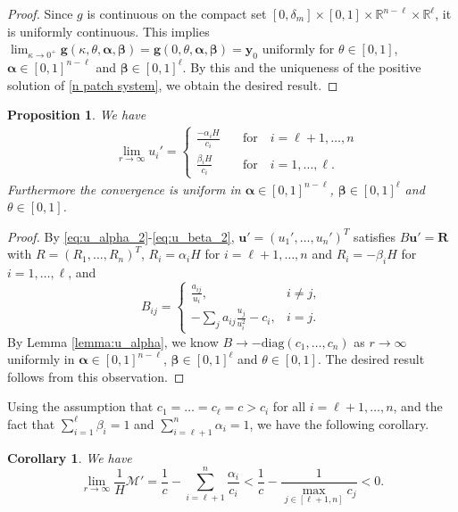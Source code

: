 \documentclass[11pt]{article}
\newtheorem{proposition}[theorem]{Proposition}
\newtheorem{corollary}[theorem]{Corollary}
\def\MM{\mathcal{M}}
\theoremstyle{definition}
\begin{document}
\begin{proof}
Since $g$ is continuous on the compact set $[0, \delta_m]\times [0, 1]\times \mathbb{R}^{n-\ell}\times\mathbb{R}^\ell$, it is uniformly continuous.
This implies $\lim_{\kappa\to 0^+} \bm g(\kappa, \theta, \bm\alpha,\bm\beta)=\bm g(0, \theta, \bm\alpha,\bm\beta)=\bm y_0$ uniformly for $\theta\in [0, 1]$, $\bm\alpha\in [0, 1]^{n-\ell}$ and $\bm\beta\in [0,1]^
\ell$. By this and the uniqueness of the positive solution of \eqref{n patch system}, we obtain the desired result.  
\end{proof}






\begin{proposition}\label{prop:u_alpha}
We have
\begin{align*}
&\lim_{r\to\infty} u_i' = \begin{cases}
\frac{-\alpha_iH}{c_i} \quad &\text{for}\quad  i=\ell+1,\dots,n\\
\frac{\beta_i H}{c_i} \quad &\text{for}\quad  i=1,\dots,\ell.
\end{cases}    
\end{align*}
Furthermore the convergence is uniform in $\bm\alpha\in [0, 1]^{n-\ell}$, $\bm\beta\in[0,1]^{\ell}$ and $\theta\in [0, 1]$. 
\end{proposition}

\begin{proof}
By \eqref{eq:u_alpha_2}-\eqref{eq:u_beta_2}, $\bm u'=(u_1', \dots, u_n')^T$ satisfies $B\bm u'=\bm R$ with $R=(R_1, \dots, R_n)^T$, $R_i=\alpha_i H$ for $i=\ell+1,\dots,n$ and $R_{i}=-\beta_i H$ for $i=1,\dots,\ell$, and 
\begin{equation*}
B_{ij}=
\left\{
\begin{array}{lll}
\frac{a_{ij}}{u_i}, \ \ &{i\neq j},\\
-\sum_{j} a_{ij}\frac{u_j}{u_i^2}-c_i,  &i=j. 
\end{array}
\right.
\end{equation*}
By Lemma \ref{lemma:u_alpha},  we know $B\to -\text{diag}(c_1,\dots, c_n)$ as $r\to\infty$ uniformly in $\bm\alpha\in [0, 1]^{n-\ell}$, $\bm\beta\in[0,1]^{\ell}$ and $\theta\in [0, 1]$. The desired result follows from this observation. 
\end{proof}

Using the assumption that $c_1=\dots=c_\ell=c>c_i$ for all $i=\ell+1,\dots,n$, and the fact that $\sum_{i=1}^\ell\beta_i=1$ and $\sum_{i=\ell+1}^n\alpha_i=1$, we have the following corollary.

\begin{corollary}\label{cor:u_alpha}
We have
\[
\lim_{r\to\infty}\frac{1}{H}\MM'= \frac{1}{c}-\sum_{i=\ell+1}^n\frac{\alpha_i}{c_i} < \frac{1}{c}-\frac{1}{\max_{j\in[\ell+1,n]}c_j} <0.
\]    
\end{corollary}
\end{document}
